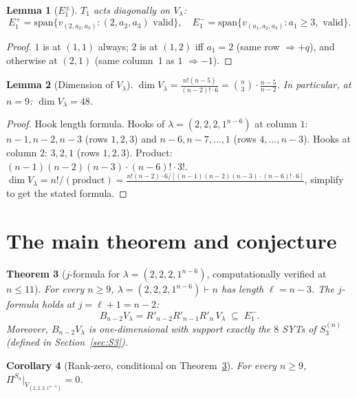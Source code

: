 \documentclass[11pt]{article}
\newtheorem{theorem}{Theorem}
\newtheorem{lemma}[theorem]{Lemma}
\newtheorem{corollary}[theorem]{Corollary}
\theoremstyle{definition}
\begin{document}
\begin{lemma}[$E_1^\pm$]\label{lem:E1}
$T_1$ acts diagonally on $V_\lambda$:
\[
   E_1^+=\mathrm{span}\{v_{(2,a_2,a_3)}:(2,a_2,a_3)\text{ valid}\},
   \quad
   E_1^-=\mathrm{span}\{v_{(a_1,a_2,a_3)}:a_1\ge 3,\text{ valid}\}.
\]
\end{lemma}

\begin{proof}
$1$ is at $(1,1)$ always; $2$ is at $(1,2)$ iff $a_1=2$ (same row
$\Rightarrow +q$), and otherwise at $(2,1)$ (same column~$1$ as
$1$ $\Rightarrow -1$).
\end{proof}

\begin{lemma}[Dimension of $V_\lambda$]\label{lem:dim-V}
$\dim V_\lambda=\frac{n!(n{-}5)}{(n{-}2)!\cdot 6}=\binom{n}{3}\cdot
\frac{n-5}{n-2}$.  In particular, at $n=9$: $\dim V_\lambda=48$.
\end{lemma}

\begin{proof}
Hook length formula.  Hooks of $\lambda=(2,2,2,1^{n-6})$ at
column $1$: $n-1,n-2,n-3$ (rows $1,2,3$) and
$n-6,n-7,\ldots,1$ (rows $4,\ldots,n-3$).  Hooks at column $2$:
$3,2,1$ (rows $1,2,3$).  Product:
$(n-1)(n-2)(n-3)\cdot(n-6)!\cdot 3!$.
$\dim V_\lambda=n!/(\text{product})=
\frac{n!(n-2)\cdot 6 / [(n-1)(n-2)(n-3)\cdot (n-6)!\cdot 6]
}{}$, simplify to get the stated formula.
\end{proof}

\section{The main theorem and conjecture}

\begin{theorem}[$j$-formula for $\lambda=(2,2,2,1^{n-6})$,
computationally verified at $n\le 11$]\label{thm:main}
For every $n\ge 9$, $\lambda=(2,2,2,1^{n-6})\vdash n$ has length
$\ell=n-3$.  The $j$-formula holds at $j=\ell+1=n-2$:
\[
   B_{n-2}V_\lambda=R'_{n-2}R'_{n-1}R'_n\,V_\lambda
   \;\subseteq\;E_1^-.
\]
Moreover, $B_{n-2}V_\lambda$ is one-dimensional with support
exactly the $8$ SYTs of $S_3^{(n)}$ (defined in
Section~\ref{sec:S3}).
\end{theorem}

\begin{corollary}[Rank-zero, conditional on Theorem~\ref{thm:main}]
\label{cor:rank-zero}
For every $n\ge 9$, $\Pi^{S_n}|_{V_{(2,2,2,1^{n-6})}}=0$.
\end{corollary}
\end{document}
